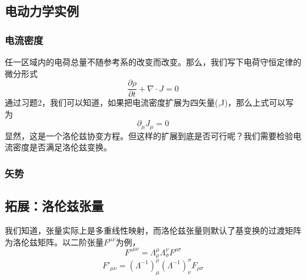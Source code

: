 \subsection{电动力学实例}
\subsubsection{电流密度}
任一区域内的电荷总量不随参考系的改变而改变。那么，我们写下电荷守恒定律的微分形式
\begin{equation}
\frac{\partial\rho}{\partial t}+\nabla \cdot J=0
\end{equation}
通过习题2，我们可以知道，如果把电流密度扩展为四矢量(\rho,\vec J)，那么上式可以写为
\begin{equation}
\partial_\mu J_\mu=0
\end{equation}
显然，这是一个洛伦兹协变方程。但这样的扩展到底是否可行呢？我们需要检验电流密度是否满足洛伦兹变换。
\subsubsection{矢势}
\subsection{拓展：洛伦兹张量}
我们知道，张量实际上是多重线性映射，而洛伦兹张量则默认了基变换的过渡矩阵为洛伦兹矩阵。以二阶张量$F^{\mu\nu} $为例，
\begin{equation}
F'^{\mu\nu}=\Lambda_\rho^\mu \Lambda_\sigma^\nu F^{\rho\sigma}  
\end{equation}
\begin{equation}
F'_{\mu\nu}=(\Lambda^{-1})_\mu^\rho (\Lambda^{-1})_\nu^\sigma F_{\rho\sigma}
\end{equation}


